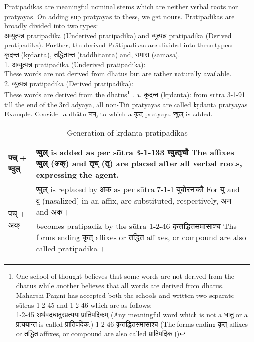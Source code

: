 Prātipadikas are meaningful nominal stems which are neither verbal roots nor pratyayas. On adding sup pratyayas to these, we get nouns. Prātipadikas are broadly divided into two types:\\
\texthindi{अव्युत्पन्न} prātipadika (Underived pratipadika) and \texthindi{व्युत्पन्न} prātipadika  (Derived pratipadika). Further, the derived Prātipadikas are divided into three types:\\ \texthindi{कृदन्त} (kṛdanta), \texthindi{तद्धितान्त} (taddhitānta) and, \texthindi{समास} (samāsa).\\
1.	\texthindi{अव्युत्पन्न} prātipadika  (Underived prātipadika):\\ These words are not derived from dhātus but are rather naturally available.\\
2.	\texthindi{व्युत्पन्न} prātipadika  (Derived prātipadika):\\ These words are derived from the dhātus\footnote{One school of thought believes that some words are not derived from the dhātus while another believes that all words are derived from dhātus. Maharshi Pāṇini has accepted both the schools and written two separate sūtras 1-2-45 and 1-2-46 which are as follows:\\
	1-2-45 \texthindi{अर्थवदधातुरप्रत्ययः प्रातिपदिकम्} (Any meaningful word which is not a \texthindi{धातु} or a \texthindi{प्रत्ययान्त} is called \texthindi{प्रातिपदिक}.)
	1-2-46 \texthindi{कृत्तद्धितसमासाश्च} (The forms ending \texthindi{कृत्} affixes or\texthindi{ तद्धित} affixes, or compound are also called \texthindi{प्रातिपदिक}।)
} .
a.	\texthindi{कृदन्त} (kṛdanta): from sūtra 3-1-91 till the end of the 3rd adyāya, all non-Tiṅ pratyayas are called kṛdanta pratyayas\\
Example: Consider a dhātu \texthindi{पच्}, to which a \texthindi{कृत्} pratyaya\texthindi{ ण्वुल्} is added.\\


\begin{table}[h!]
	\begin{center}
		\begin{tabular}{ |p{2cm}|p{14cm}| } 
 		\hline
		\multirow{2}{*}{\texthindi{पच् + ण्वुल्}} &	
		\texthindi{ण्वुल्} is added as per sūtra 
		3-1-133 \texthindi{ण्वुल्तृचौ}
		The affixes \texthindi{ण्वुल् (अक्)} and\texthindi{ तृच् (तृ)} are placed after all verbal roots, expressing the agent.\\
		\hline
		\multirow{2}{*}{\texthindi{पच् + अक्}}&
		\texthindi{ण्वुल्} is replaced by \texthindi{अक} as per sūtra 7-1-1 \texthindi{युवोरनाकौ}
		For \texthindi{यु} and \texthindi{वु} (nasalized) in an affix, are substituted, respectively, \texthindi{अन} and \texthindi{अक}।\\
		\hline
		\multirow{2}{*}{\texthindi{पाचक}} &	
		becomes pratipadik by the sūtra
		1-2-46 \texthindi{कृत्तद्धितसमासाश्च}
		The forms ending \texthindi{कृत्} affixes or \texthindi{तद्धित} affixes, or compound are also called prātipadika ।\\
		\hline
		\end{tabular}
		\caption{Generation of kṛdanta prātipadikas}
		\label{table:3.2}
	\end{center}
\end{table}

